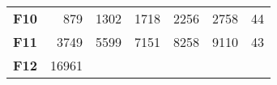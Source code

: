 \documentclass[12pt,a4paper]{article}
\begin{document}
\begin{longtable}[c]{@{}crrrrrr@{}}
\begin{minipage}[t]{0.11\columnwidth}
\textbf{F10}
\strut\end{minipage} &
\begin{minipage}[t]{0.08\columnwidth}\raggedleft\strut
879
\strut\end{minipage} &
\begin{minipage}[t]{0.08\columnwidth}\raggedleft\strut
1302
\strut\end{minipage} &
\begin{minipage}[t]{0.09\columnwidth}\raggedleft\strut
1718
\strut\end{minipage} &
\begin{minipage}[t]{0.10\columnwidth}\raggedleft\strut
2256
\strut\end{minipage} &
\begin{minipage}[t]{0.11\columnwidth}\raggedleft\strut
2758
\strut\end{minipage} &
\begin{minipage}[t]{0.07\columnwidth}\raggedleft\strut
44
\strut\end{minipage}\tabularnewline
\begin{minipage}[t]{0.11\columnwidth}\centering\strut
\textbf{F11}
\strut\end{minipage} &
\begin{minipage}[t]{0.08\columnwidth}\raggedleft\strut
3749
\strut\end{minipage} &
\begin{minipage}[t]{0.08\columnwidth}\raggedleft\strut
5599
\strut\end{minipage} &
\begin{minipage}[t]{0.09\columnwidth}\raggedleft\strut
7151
\strut\end{minipage} &
\begin{minipage}[t]{0.10\columnwidth}\raggedleft\strut
8258
\strut\end{minipage} &
\begin{minipage}[t]{0.11\columnwidth}\raggedleft\strut
9110
\strut\end{minipage} &
\begin{minipage}[t]{0.07\columnwidth}\raggedleft\strut
43
\strut\end{minipage}\tabularnewline
\begin{minipage}[t]{0.11\columnwidth}\centering\strut
\textbf{F12}
\strut\end{minipage} &
\begin{minipage}[t]{0.08\columnwidth}\raggedleft\strut
16961
\strut\end{minipage} &
\begin{minipage}[t]{0.08\columnwidth}\raggedleft\strut

\end{minipage}
\end{longtable}
\end{document}
